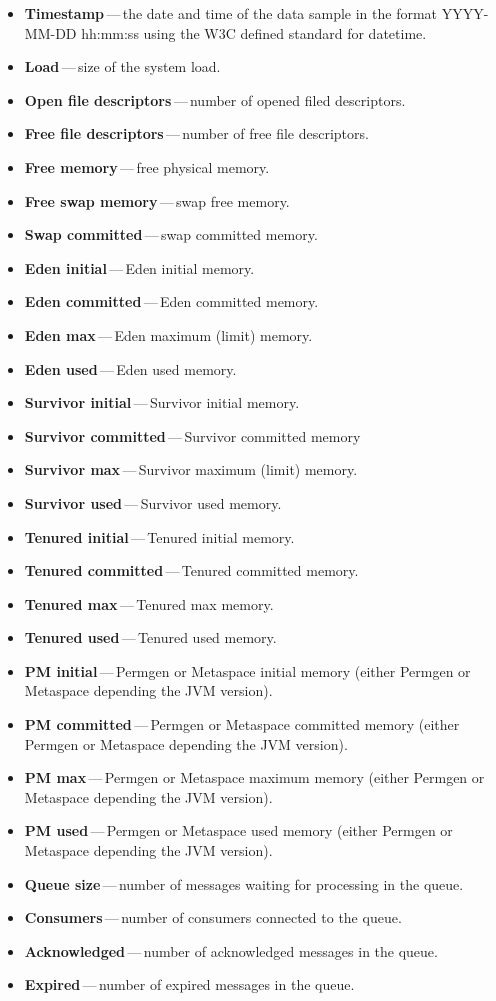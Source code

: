 \begin{itemize}
	\setlength\itemsep{0em}
	\item \textbf{Timestamp}\,---\,the date and time of the data sample in the format YYYY-MM-DD hh:mm:ss using the W3C defined standard for datetime.
	\item \textbf{Load}\,---\,size of the system load.
	\item \textbf{Open file descriptors}\,---\,number of opened filed descriptors.
	\item \textbf{Free file descriptors}\,---\,number of free file descriptors.
	\item \textbf{Free memory}\,---\,free physical memory.
	\item \textbf{Free swap memory}\,---\,swap free memory.
	\item \textbf{Swap committed}\,---\,swap committed memory.
	\item \textbf{Eden initial}\,---\,Eden initial memory.
	\item \textbf{Eden committed}\,---\,Eden committed memory.
	\item \textbf{Eden max}\,---\,Eden maximum (limit) memory.
	\item \textbf{Eden used}\,---\,Eden used memory.
	\item \textbf{Survivor initial}\,---\,Survivor initial memory.
	\item \textbf{Survivor committed}\,---\,Survivor committed memory
	\item \textbf{Survivor max}\,---\,Survivor maximum (limit) memory.
	\item \textbf{Survivor used}\,---\,Survivor used memory.
	\item \textbf{Tenured initial}\,---\,Tenured initial memory.
	\item \textbf{Tenured committed}\,---\,Tenured committed memory.
	\item \textbf{Tenured max}\,---\,Tenured max memory.
	\item \textbf{Tenured used}\,---\,Tenured used memory.
	\item \textbf{PM initial}\,---\,Permgen or Metaspace initial memory (either Permgen or Metaspace depending the JVM version).
	\item \textbf{PM committed}\,---\,Permgen or Metaspace committed memory (either Permgen or Metaspace depending the JVM version).
	\item \textbf{PM max}\,---\,Permgen or Metaspace maximum memory (either Permgen or Metaspace depending the JVM version).
	\item \textbf{PM used}\,---\,Permgen or Metaspace used memory (either Permgen or Metaspace depending the JVM version).
	\item \textbf{Queue size}\,---\,number of messages waiting for processing in the queue.
	\item \textbf{Consumers}\,---\,number of consumers connected to the queue.
	\item \textbf{Acknowledged}\,---\,number of acknowledged messages in the queue.
	\item \textbf{Expired}\,---\,number of expired messages in the queue.
\end{itemize}

